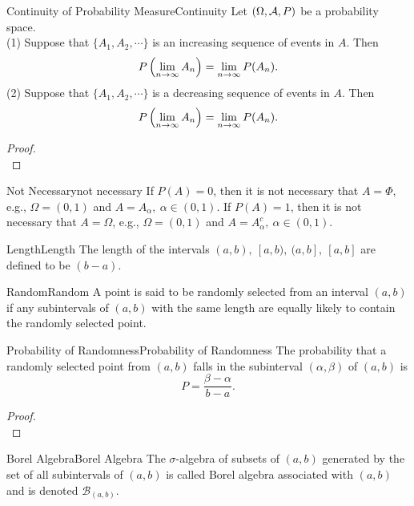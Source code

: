 \documentclass{elegantbook}
\begin{document}
\begin{theorem}{Continuity of Probability Measure}{Continuity}
Let $(\Omega,\mathcal{A}, P)$ be a probability space.\\
(1) Suppose that $\{A_1,A_2,\cdots\}$ is an increasing sequence of events in $A$. Then $$P\left(\displaystyle\lim\limits_{n\to\infty} A_n\right)=\displaystyle\lim\limits_{n\to\infty} P(A_n).$$
(2) Suppose that $\{A_1,A_2,\cdots\}$ is a decreasing sequence of events in $A$. Then $$P\left(\displaystyle\lim\limits_{n\to\infty} A_n\right)=\displaystyle\lim\limits_{n\to\infty} P(A_n).$$
\end{theorem}

\begin{proof}
\\[4cm]\vspace{0.01cm}
\end{proof}

\begin{remark}{Not Necessary}{not necessary}
If $P(A)=0$, then it is not necessary that $A=\Phi$, e.g., $\Omega=(0,1)$ and $A=A_\alpha,\ \alpha\in(0,1)$.
If $P(A)=1$, then it is not necessary that $A=\Omega$, e.g., $\Omega=(0,1)$ and $A=A_\alpha^c,\ \alpha\in(0,1)$.
\end{remark}

\begin{definition}{Length}{Length}
The length of the intervals $(a,b),\ [a,b),\ (a,b],\ [a,b]$ are def\/ined to be $(b-a)$.
\end{definition}

\begin{definition}{Random}{Random}
A point is said to be randomly selected from an interval $(a,b)$ if any subintervals of $(a,b)$ with the same length are equally likely to contain the randomly selected point.
\end{definition}

\begin{theorem}{Probability of Randomness}{Probability of Randomness}
The probability that a randomly selected point from $(a,b)$ falls in the subinterval $(\alpha,\beta)$ of $(a,b)$ is $$P=\frac{\beta-\alpha}{b-a}.$$
\end{theorem}

\begin{proof}
\\[5cm]\vspace{0.01cm}
\end{proof}

\begin{definition}{Borel Algebra}{Borel Algebra}
The $\sigma$-algebra of subsets of $(a,b)$ generated by the set of all subintervals of $(a,b)$ is called Borel algebra associated with $(a,b)$ and is denoted $\mathcal{B}_{(a,b)}$.
\end{definition}
\end{document}

